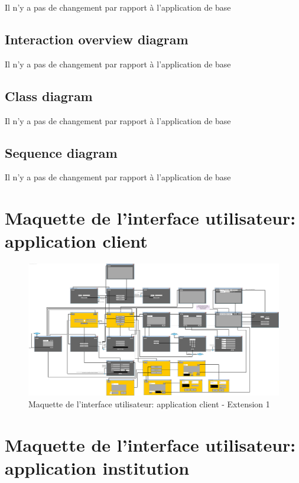 \documentclass[]{report}
\begin{document}
Il n'y a pas de changement par rapport à l'application de base


\subsection{Interaction overview diagram}

Il n'y a pas de changement par rapport à l'application de base

\subsection{Class diagram}

Il n'y a pas de changement par rapport à l'application de base

\subsection{Sequence diagram}

Il n'y a pas de changement par rapport à l'application de base

\newpage

\section{Maquette de l'interface utilisateur: application client}

\begin{figure}[h!]
	\centering\includegraphics[width=\linewidth]{img/UI-client-Extension-1.pdf}
	\caption{Maquette de l'interface utilisateur: application client - Extension 1}
\end{figure}



\newpage
\section{Maquette de l'interface utilisateur: application institution}
\end{document}
